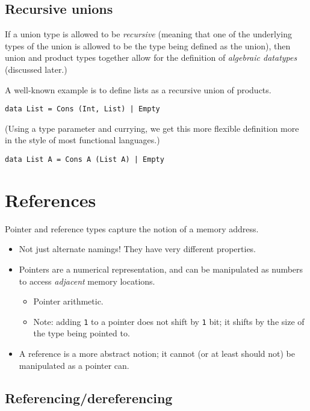 \documentclass[11pt]{article}
\theoremstyle{definition}
\begin{document}
\subsection{Recursive unions}
\label{sec:orga3a93b6}

If a union type is allowed to be \emph{recursive} (meaning that
one of the underlying types of the union is allowed to be
the type being defined as the union),
then union and product types together allow for the definition
of \emph{algebraic datatypes} (discussed later.)

A well-known example is to define lists as a recursive union
of products.
\begin{verbatim}
data List = Cons (Int, List) | Empty
\end{verbatim}

(Using a type parameter and currying, we get this more flexible
definition more in the style of most functional languages.)
\begin{verbatim}
data List A = Cons A (List A) | Empty
\end{verbatim}

\section{References}
\label{sec:orgefb2c55}

Pointer and reference types capture the notion of a
memory address.
\begin{itemize}
\item Not just alternate namings! They have very different properties.
\item Pointers are a numerical representation, and can be manipulated
as numbers to access \emph{adjacent} memory locations.
\begin{itemize}
\item Pointer arithmetic.
\item Note: adding \texttt{1} to a pointer does not shift by \texttt{1} bit;
it shifts by the size of the type being pointed to.
\end{itemize}
\item A reference is a more abstract notion;
it cannot (or at least should not) be manipulated as a pointer can.
\end{itemize}

\subsection{Referencing/dereferencing}
\label{sec:orgafb2a41}
\end{document}

